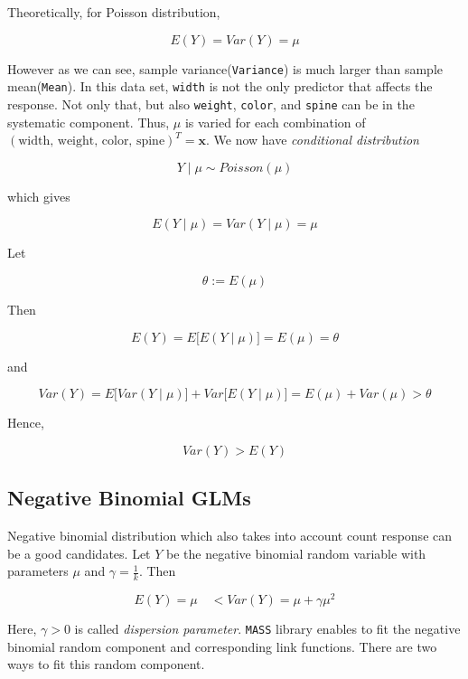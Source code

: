 \documentclass[]{book}
\begin{document}
Theoretically, for Poisson distribution,

\[E(Y) = Var(Y) = \mu\]

However as we can see, sample variance(\texttt{Variance}) is much larger than sample mean(\texttt{Mean}). In this data set, \texttt{width} is not the only predictor that affects the response. Not only that, but also \texttt{weight}, \texttt{color}, and \texttt{spine} can be in the systematic component. Thus, \(\mu\) is varied for each combination of \((\text{width, weight, color, spine})^T = \mathbf{x}\). We now have \emph{conditional distribution}

\[Y \mid \mu \sim Poisson(\mu)\]

which gives

\[E(Y \mid \mu) = Var(Y \mid \mu) = \mu\]

Let

\[\theta := E(\mu)\]

Then

\[E(Y) = E\big[E(Y \mid \mu)\big] = E(\mu) = \theta\]

and

\[Var(Y) = E\big[ Var(Y \mid \mu) \big] + Var\big[ E(Y \mid \mu) \big] = E(\mu) + Var(\mu) > \theta\]

Hence,

\[Var(Y) > E(Y)\]

\hypertarget{negative-binomial-glms}{%
\subsection{Negative Binomial GLMs}\label{negative-binomial-glms}}

Negative binomial distribution which also takes into account count response can be a good candidates. Let \(Y\) be the negative binomial random variable with parameters \(\mu\) and \(\gamma = \frac{1}{k}\). Then

\[E(Y) = \mu \quad < Var(Y) = \mu + \gamma\mu^2\]

Here, \(\gamma > 0\) is called \emph{dispersion parameter}. \texttt{MASS} library enables to fit the negative binomial random component and corresponding link functions. There are two ways to fit this random component.
\end{document}
